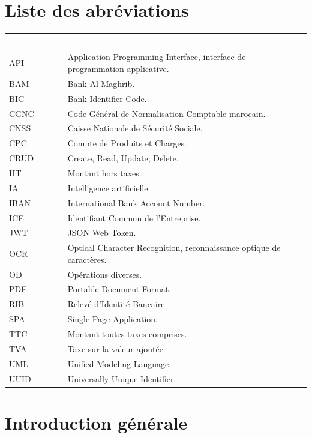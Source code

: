 \documentclass[12pt,a4paper,oneside]{report}
\newcommand{\TableSetup}{%
  \arrayrulecolor{ComptaTableLine}%
  \setlength{\arrayrulewidth}{0.45pt}%
  \renewcommand{\arraystretch}{1.18}%
}
\newcommand{\TableHead}[1]{\textcolor{white}{\textbf{#1}}}
\begin{document}
\chapter*{Liste des abréviations}
\TableSetup
\begin{longtable}{|L{3cm}|L{11cm}|}
\toprule
{}\TableHead{Abréviation} & \TableHead{Signification} \\
\midrule
API & Application Programming Interface, interface de programmation applicative. \\
BAM & Bank Al-Maghrib. \\
BIC & Bank Identifier Code. \\
CGNC & Code Général de Normalisation Comptable marocain. \\
CNSS & Caisse Nationale de Sécurité Sociale. \\
CPC & Compte de Produits et Charges. \\
CRUD & Create, Read, Update, Delete. \\
HT & Montant hors taxes. \\
IA & Intelligence artificielle. \\
IBAN & International Bank Account Number. \\
ICE & Identifiant Commun de l'Entreprise. \\
JWT & JSON Web Token. \\
OCR & Optical Character Recognition, reconnaissance optique de caractères. \\
OD & Opérations diverses. \\
PDF & Portable Document Format. \\
RIB & Relevé d'Identité Bancaire. \\
SPA & Single Page Application. \\
TTC & Montant toutes taxes comprises. \\
TVA & Taxe sur la valeur ajoutée. \\
UML & Unified Modeling Language. \\
UUID & Universally Unique Identifier. \\
\bottomrule
\end{longtable}

\clearpage
{}

\chapter{Introduction générale}
\end{document}
